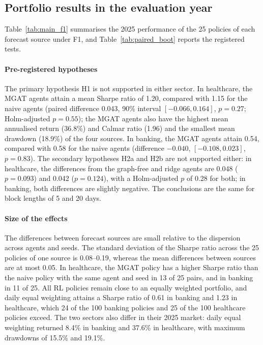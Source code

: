\subsection{Portfolio results in the evaluation year}\label{subsec:comparison}

{\color{blue}Table~\ref{tab:main_f1} summarises the 2025 performance of the 25 policies of each forecast source under F1, and Table~\ref{tab:paired_boot} reports the registered tests.

\paragraph{Pre-registered hypotheses}
The primary hypothesis H1 is not supported in either sector. In healthcare, the MGAT agents attain a mean Sharpe ratio of 1.20, compared with 1.15 for the naive agents (paired difference 0.043, 90\% interval $[-0.066, 0.164]$, $p=0.27$; Holm-adjusted $p=0.55$); the MGAT agents also have the highest mean annualised return (36.8\%) and Calmar ratio (1.96) and the smallest mean drawdown (18.9\%) of the four sources. In banking, the MGAT agents attain 0.54, compared with 0.58 for the naive agents (difference $-0.040$, $[-0.108, 0.023]$, $p=0.83$). The secondary hypotheses H2a and H2b are not supported either: in healthcare, the differences from the graph-free and ridge agents are 0.048 ($p=0.093$) and 0.042 ($p=0.124$), with a Holm-adjusted $p$ of 0.28 for both; in banking, both differences are slightly negative. The conclusions are the same for block lengths of 5 and 20 days.

\paragraph{Size of the effects}
The differences between forecast sources are small relative to the dispersion across agents and seeds. The standard deviation of the Sharpe ratio across the 25 policies of one source is 0.08--0.19, whereas the mean differences between sources are at most 0.05. In healthcare, the MGAT policy has a higher Sharpe ratio than the naive policy with the same agent and seed in 13 of 25 pairs, and in banking in 11 of 25. All RL policies remain close to an equally weighted portfolio, and daily equal weighting attains a Sharpe ratio of 0.61 in banking and 1.23 in healthcare, which 24 of the 100 banking policies and 25 of the 100 healthcare policies exceed. The two sectors also differ in their 2025 market: daily equal weighting returned 8.4\% in banking and 37.6\% in healthcare, with maximum drawdowns of 15.5\% and 19.1\%.\par}

